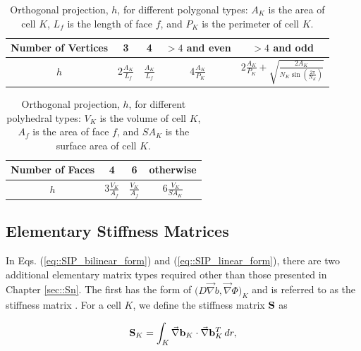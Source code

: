 \begin{table}[h]
\centering
\caption{Orthogonal projection, $h$, for different polygonal types: $A_K$ is the area of cell $K$, $L_f$ is the length of face $f$, and $P_K$ is the perimeter of cell $K$.}
\def\arraystretch{1.4}
\begin{tabular}{|c|c|c|c|c|}
	\hline
	Number of Vertices & 3 & 4 & $>4$ and even& $>4$ and odd \\
	\hline
	$h$ & $2 \frac{A_K}{L_f}$ & $\frac{A_K}{L_f}$ & $4 \frac{A_K}{P_K}$ & $2 \frac{A_K}{P_K} + \sqrt{\frac{2 A_K}{N_K \sin(\frac{2 \pi}{N_K})}}$ \\
	\hline
\end{tabular}
\label{tab::orth_proj_2D}
\end{table}

\begin{table}[h]
\centering
\caption{Orthogonal projection, $h$, for different polyhedral types: $V_K$ is the volume of cell $K$, $A_f$ is the area of face $f$, and $SA_K$ is the surface area of cell $K$.}
\def\arraystretch{1.4}
\begin{tabular}{|c|c|c|c|}
	\hline
	Number of Faces & 4 & 6 & otherwise \\
	\hline
	$h$ & $3 \frac{V_K}{A_f}$ & $\frac{V_K}{A_f}$ & $6 \frac{V_K}{SA_K}$  \\ [1ex]
	\hline
\end{tabular}
\label{tab::orth_proj_3D}
\end{table}

\subsection{Elementary Stiffness Matrices}
\label{sec::DSA_SIP_Stiffness}

In Eqs. (\ref{eq::SIP_bilinear_form}) and (\ref{eq::SIP_linear_form}), there are two additional elementary matrix types required other than those presented in Chapter \ref{sec::Sn}. The first has the form of $\Big(  D \vec{\nabla}  b , \vec{\nabla} \Phi  \Big)_{K}$ and is referred to as the stiffness matrix \cite{akin1982application}. For a cell $K$, we define the stiffness matrix ${\bf S}$ as

\begin{equation}
\label{eq::DSA_stiffness_matrix_analytical}
{\bf S}_K =    \int_K \vec{\nabla} {\bf b}_K \cdot \vec{\nabla} {\bf b}_K^T \, d r ,
\end{equation}

